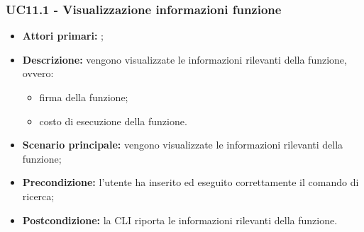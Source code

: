 \subsubsection{UC11.1 - Visualizzazione informazioni funzione }
\begin{itemize}
	\item \textbf{Attori primari:} \ua{};
	\item \textbf{Descrizione:} vengono visualizzate le informazioni rilevanti della funzione, ovvero:
	\begin{itemize}
		\item firma della funzione;
		\item costo di esecuzione della funzione.
	\end{itemize}
	\item \textbf{Scenario principale:} vengono visualizzate le informazioni rilevanti della funzione; 
	\item \textbf{Precondizione:} l’utente ha inserito ed eseguito correttamente il comando di ricerca;  
	\item \textbf{Postcondizione:} la CLI riporta le informazioni rilevanti della funzione.
\end{itemize}